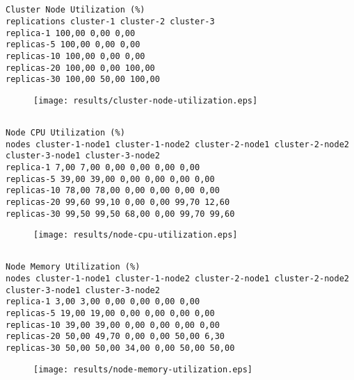 \documentclass{elsart}
\begin{document}
\subsection{}

\begin{lstlisting}[caption={}]
Cluster Node Utilization (%)
replications cluster-1 cluster-2 cluster-3
replica-1 100,00 0,00 0,00
replicas-5 100,00 0,00 0,00
replicas-10 100,00 0,00 0,00
replicas-20 100,00 0,00 100,00
replicas-30 100,00 50,00 100,00
\end{lstlisting}

\begin{figure}[ht]
\centering
\texttt{[image: results/cluster-node-utilization.eps]}
\caption{}\label{fig:cluster-node-utilization.eps}
\end{figure}

\subsection{}

\begin{lstlisting}[caption={}]
Node CPU Utilization (%)
nodes cluster-1-node1 cluster-1-node2 cluster-2-node1 cluster-2-node2 cluster-3-node1 cluster-3-node2
replica-1 7,00 7,00 0,00 0,00 0,00 0,00
replicas-5 39,00 39,00 0,00 0,00 0,00 0,00
replicas-10 78,00 78,00 0,00 0,00 0,00 0,00
replicas-20 99,60 99,10 0,00 0,00 99,70 12,60
replicas-30 99,50 99,50 68,00 0,00 99,70 99,60
\end{lstlisting}

\begin{figure}[ht]
\centering
\texttt{[image: results/node-cpu-utilization.eps]}
\caption{}\label{fig:node-cpu-utilization.eps}
\end{figure}

\subsection{}

\begin{lstlisting}[caption={}]
Node Memory Utilization (%)
nodes cluster-1-node1 cluster-1-node2 cluster-2-node1 cluster-2-node2 cluster-3-node1 cluster-3-node2
replica-1 3,00 3,00 0,00 0,00 0,00 0,00
replicas-5 19,00 19,00 0,00 0,00 0,00 0,00
replicas-10 39,00 39,00 0,00 0,00 0,00 0,00
replicas-20 50,00 49,70 0,00 0,00 50,00 6,30
replicas-30 50,00 50,00 34,00 0,00 50,00 50,00
\end{lstlisting}

\begin{figure}[ht]
\centering
\texttt{[image: results/node-memory-utilization.eps]}
\caption{}\label{fig:node-memory-utilization.eps}
\end{figure}
\end{document}
